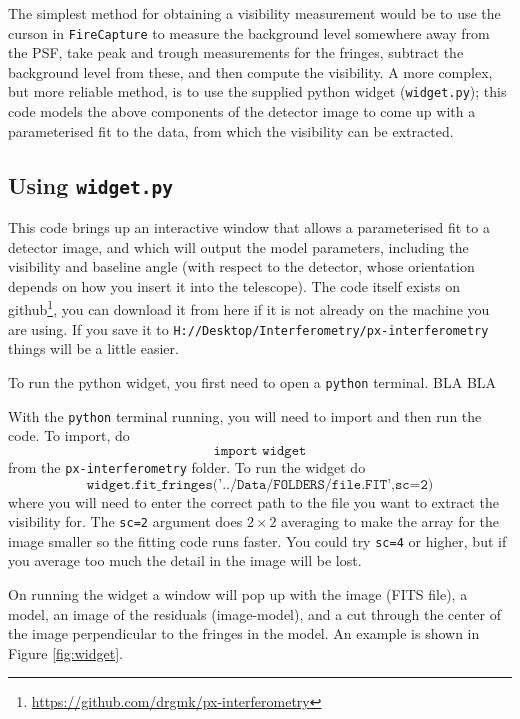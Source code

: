 \documentclass[11pt]{article}
\begin{document}
The simplest method for obtaining a visibility measurement would be to use the curson in \texttt{FireCapture} to measure the background level somewhere away from the PSF, take peak and trough measurements for the fringes, subtract the background level from these, and then compute the visibility. A more complex, but more reliable method, is to use the supplied python widget (\texttt{widget.py}); this code models the above components of the detector image to come up with a parameterised fit to the data, from which the visibility can be extracted.

\subsection{Using \texttt{widget.py}}\label{sec:widget}

This code brings up an interactive window that allows a parameterised fit to a detector image, and which will output the model parameters, including the visibility and baseline angle (with respect to the detector, whose orientation depends on how you insert it into the telescope). The code itself exists on github\footnote{\href{https://github.com/drgmk/px-interferometry}{https://github.com/drgmk/px-interferometry}}, you can download it from here if it is not already on the machine you are using. If you save it to \texttt{H://Desktop/Interferometry/px-interferometry} things will be a little easier.

To run the python widget, you first need to open a \texttt{python} terminal. BLA BLA 

With the \texttt{python} terminal running, you will need to import and then run the code. To import, do $$\texttt{import widget}$$
from the \texttt{px-interferometry} folder. To run the widget do
$$\texttt{widget.fit\_fringes('../Data/FOLDERS/file.FIT',sc=2)}$$
where you will need to enter the correct path to the file you want to extract the visibility for. The \texttt{sc=2} argument does $2 \times 2$ averaging to make the array for the image smaller so the fitting code runs faster. You could try \texttt{sc=4} or higher, but if you average too much the detail in the image will be lost.

On running the widget a window will pop up with the image (FITS file), a model, an image of the residuals (image-model), and a cut through the center of the image perpendicular to the fringes in the model. An example is shown in Figure \ref{fig:widget}.
\end{document}
